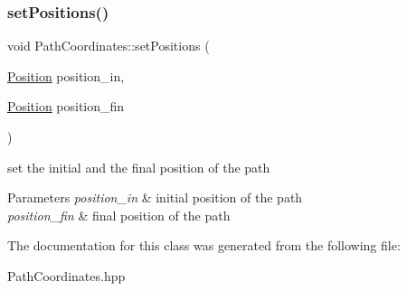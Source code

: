 \subsubsection{\texorpdfstring{set\+Positions()}{setPositions()}}
{\footnotesize\ttfamily void Path\+Coordinates\+::set\+Positions (\begin{DoxyParamCaption}\item[{\mbox{\hyperlink{class_position}{Position}}}]{position\+\_\+in,  }\item[{\mbox{\hyperlink{class_position}{Position}}}]{position\+\_\+fin }\end{DoxyParamCaption})}

set the initial and the final position of the path 
\begin{DoxyParams}{Parameters}
{\em position\+\_\+in} & initial position of the path \\
\hline
{\em position\+\_\+fin} & final position of the path \\
\hline
\end{DoxyParams}


The documentation for this class was generated from the following file\+:\begin{DoxyCompactItemize}
\item 
Path\+Coordinates.\+hpp\end{DoxyCompactItemize}
